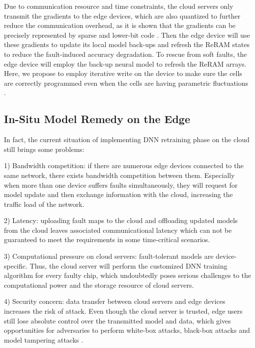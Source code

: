 Due to communication resource and time constraints, the cloud servers only transmit the gradients to the edge devices, which are also quantized to further reduce the communication overhead, as it is shown that the gradients can be precisely represented by sparse and lower-bit code \cite{NIPS2017_6749}. Then the edge device will use these gradients to update its local model back-ups and refresh the ReRAM states to reduce the fault-induced accuracy degradation.  To rescue from soft faults, the edge device will employ the back-up neural model to refresh the ReRAM arrays. Here, we propose to employ iterative write on the device to make sure the cells are correctly programmed even when the cells are having parametric fluctuations \cite{5482157}.
                                                                                                                                                                
\subsection{In-Situ Model Remedy on the Edge}
In fact, the current situation of implementing DNN retraining phase on the cloud still brings some problems: 

1) Bandwidth competition: if there are numerous edge devices connected to the same network, there exists bandwidth competition between them. Especially when more than one device suffers faults simultaneously, they will request for model update and then exchange information with the cloud, increasing the traffic load of the network.

2) Latency:  uploading fault maps to the cloud and offloading updated models from the cloud leaves associated communicational latency which can not be guaranteed to meet the requirements in some time-critical scenarios.

3) Computational pressure on cloud servers: fault-tolerant models are device-specific. Thus, the cloud server will perform the customized DNN training algorithm for every faulty chip, which undoubtedly poses serious challenges to the computational power and the storage resource of cloud servers.

4) Security concern: data transfer between cloud servers and edge devices increases the risk of attack. Even though the cloud server is trusted, edge users still lose absolute control over the transmitted model and data, which gives opportunities for adversaries to perform white-box attacks, black-box attacks and model tampering attacks \cite{10.1145/3287624.3287695}.

